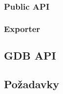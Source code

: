 \subsubsection{Public API}




\subsubsection{Exporter}



\subsection{GDB API} %

\subsection{Požadavky}



